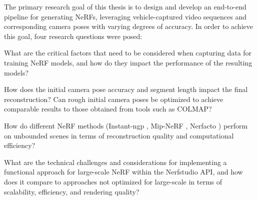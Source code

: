 The primary research goal of this thesis is to design and develop an end-to-end pipeline for generating NeRFs, leveraging vehicle-captured video sequences and corresponding camera poses with varying degrees of accuracy. In order to achieve this goal, four research questions were posed:


\begin{description}[leftmargin=!,labelwidth=\widthof{RQ 1:}]
\item[\textbf{RQ 1:}] What are the critical factors that need to be considered when capturing data for training NeRF models, and how do they impact the performance of the resulting models?

\item[\textbf{RQ 2:}] How does the initial camera pose accuracy and segment length impact the final reconstruction? Can rough initial camera poses be optimized to achieve comparable results to those obtained from tools such as COLMAP?

\item[\textbf{RQ 3:}] How do different NeRF methods (Instant-ngp \cite{muller_instant_2022}, Mip-NeRF \cite{barron_mip-nerf_2021}, Nerfacto \cite{tancik_nerfstudio_2023}) perform on unbounded scenes in terms of reconstruction quality and computational efficiency?

\item[\textbf{RQ 4:}] What are the technical challenges and considerations for implementing a functional approach for large-scale NeRF within the Nerfstudio API, and how does it compare to approaches not optimized for large-scale in terms of scalability, efficiency, and rendering quality?


\end{description}

\begin{comment}
The research goal for this thesis is:
\begin{description}[leftmargin=!,labelwidth=\widthof{RQ:}]
\item[\textbf{RG:}] Design and develop an end-to-end pipeline for generating NeRFs, leveraging vehicle-captured video sequences and corresponding camera poses with varying degrees of accuracy.
\end{description}

In order to achieve this goal, four research questions were posed:
\end{comment}




